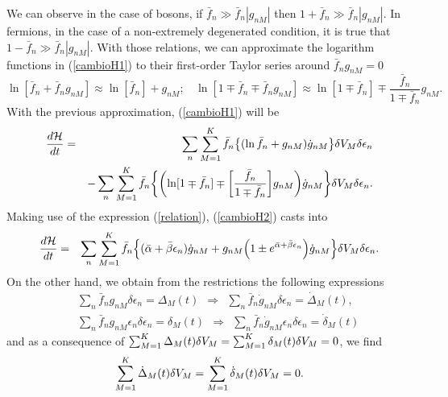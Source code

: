 We can observe in the case of bosons, if $\bar{f}_n \gg \bar{f}_n |g_{nM}|$
then $1+\bar{f}_n \gg \bar{f}_n |g_{nM}|$. In fermions, in the case of a
non-extremely degenerated condition, it is true that $1-\bar{f}_n \gg \bar{f}_n
|g_{nM}|$. With those relations, we can approximate the logarithm functions in
(\ref{cambioH1}) to their first-order Taylor series around $\bar f_n g_{nM}=0$
%
\begin{equation}
    \ln [\bar{f}_n+\bar{f}_n g_{nM}] \approx \ln [\bar{f}_n]+ g_{nM}; \ \ \ \ \ln[1\mp\bar{f}_n\mp\bar{f}_n g_{nM}] \approx \ln[1\mp\bar{f}_n]\mp\frac{\bar{f}_n}{1\mp\bar{f}_{n}} g_{nM}. \label{lnapproximation}
\end{equation}
%
With the previous approximation, (\ref{cambioH1}) will be
%
\begin{eqnarray}
    \frac{d\mathcal{H}}{dt}&=&\sum_n \sum_{M=1}^{K} \bar{f}_n\left \{ (\ln \bar{f}_n+ g_{nM})\dot{g}_{nM}\right\} \de V_M \delta \epsilon_n \nonumber \\
    &&-\sum_{n}\sum_{M=1}^{K}\bar f_n\left\{ \left( \ln[1\mp\bar{f}_n]\mp \left[\frac{\bar{f}_n}{1\mp\bar{f}_n} \right] g_{nM}\right)\dot{g}_{nM} \right \}\de V_M \delta \epsilon_n.\label{cambioH2}
\end{eqnarray}
%
Making use of the expression (\ref{relation}),
(\ref{cambioH2}) casts into
%
\begin{eqnarray}
    \frac{d\mathcal{H}}{dt}&=&\sum_n \sum_{M=1}^{K} \bar{f}_n\left \{ (\bar{\alpha}+\bar{\beta}{\epsilon}_n)\dot{g}_{nM}+ g_{nM}\left(1\pm e^{\bar{\alpha}+\bar{\beta}{\epsilon}_n}\right)\dot{g}_{nM} \right \} \de V_M \delta \epsilon_n. \nonumber \\
    \label{cambioH3}
\end{eqnarray}
%
On the other hand, we obtain from the restrictions the following expressions
%
\begin{eqnarray}
    &&\sum_n \bar{f}_n g_{nM} \delta \epsilon_n=\Delta_M(t) \ \  \Rightarrow \ \  \sum_n \bar{f}_n \dot{g}_{nM} \delta \epsilon_n=\dot{\Delta}_M(t), \nonumber \\
    &&\sum_n  \bar{f}_n g_{nM}\epsilon_n \delta \epsilon_n=\delta_M(t) \ \  \Rightarrow \ \  \sum_n \bar{f}_n \dot{g}_{nM}\epsilon_n \delta \epsilon_n=\dot{\delta}_M(t)
\end{eqnarray}
%
and as a consequence of $\sum_{M=1}^{K} \Delta_M(t) \delta V_M  =\sum_{M=1}^{K} \delta_M(t) \delta V_M =0$, we find
%
\begin{equation}
    \sum_{M=1}^{K} \dot{\Delta}_M(t) \delta V_M =\sum_{M=1}^{K} \dot{\delta}_{M}(t) \delta V_M=0.
\end{equation}
